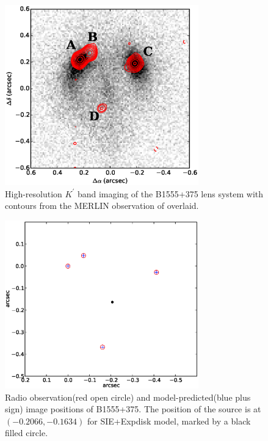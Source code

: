 \documentclass[useAMS,usenatbib]{mn2e}
\begin{document}
\begin{figure}
\includegraphics[width=84mm]{1555_ao_merlin_overlay.eps}
\caption{High-resolution  $K^\prime$ band imaging of the B1555+375 lens system 
with contours from the MERLIN observation of \citet{Marlow99} overlaid. 
%
\label{fig:merlin}}
\end{figure}


\begin{figure}
\includegraphics[width=84mm]{point_source.eps}
\caption{Radio observation(red open circle) and model-predicted(blue plus sign) image positions of B1555+375. The position of the source is at $(-0.2066,-0.1634)$ for SIE+Expdisk model, marked by a black filled circle. \label{fig2}}
\end{figure}
\end{document}
